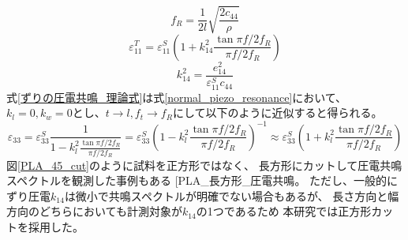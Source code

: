 \documentclass[dvipdfmx,12pt,a4paper]{jreport}
\makeatletter
\DeclareRobustCommand\cite{\unskip
    	\@ifnextchar[{\@tempswatrue\@citex}{\@tempswafalse\@citex[]}}
\makeatother
\begin{document}
			\begin{equation}
				f_R = \frac{1}{2l}\sqrt{\frac{2c_{44}}{\rho}}
				\label{ずりの共鳴周波数}
			\end{equation}
			\begin{equation}
				\varepsilon_{11}^T=\varepsilon_{11}^S\left(1+k_{14}^2\frac{\tan{\pi f/2f_R}}{\pi f/2f_R}\right)
				\label{ずりの圧電共鳴_理論式}
			\end{equation}
			\begin{equation}
				k_{14}^2=\frac{e_{14}^2}{\varepsilon_{11}^Sc_{44}}
				\label{ずりの電気機械結合係数}
			\end{equation}
			式\ref{ずりの圧電共鳴_理論式}は式\ref{normal_piezo_resonance}において、
			$k_l=0, k_w=0$とし、$t\rightarrow l, f_t \rightarrow f_R$にして以下のように近似すると得られる。
			\begin{equation}
				\varepsilon_{33} =
				\varepsilon_{33}^S
				\frac{1}{1-k_l^2\frac{\tan{\pi f/2f_R}}{\pi f/2f_R}}
				= \varepsilon_{33}^S\left(1-k_l^2\frac{\tan{\pi f/2f_R}}{\pi f/2f_R}\right)^{-1}
				\approx \varepsilon_{33}^S\left(1+k_l^2\frac{\tan{\pi f/2f_R}}{\pi f/2f_R}\right)
			\end{equation}
			図\ref{PLA_45_cut}のように試料を正方形ではなく、
			長方形にカットして圧電共鳴スペクトルを観測した事例もある
			\cite{PLA_長方形_圧電共鳴}。
			ただし、一般的にずり圧電$k_{14}$は微小で共鳴スペクトルが明確でない場合もあるが、
			長さ方向と幅方向のどちらにおいても計測対象が$k_{14}$の1つであるため
			本研究では正方形カットを採用した。
\end{document}
